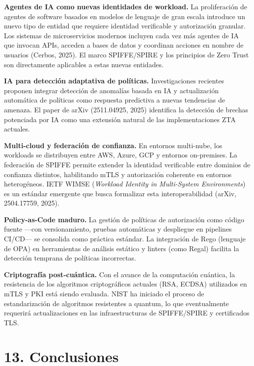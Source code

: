 \documentclass[12pt,a4paper]{article}
\begin{document}
\textbf{Agentes de IA como nuevas identidades de workload.} La proliferación de agentes de software basados en modelos de lenguaje de gran escala introduce un nuevo tipo de entidad que requiere identidad verificable y autorización granular. Los sistemas de microservicios modernos incluyen cada vez más agentes de IA que invocan APIs, acceden a bases de datos y coordinan acciones en nombre de usuarios (Cerbos, 2025). El marco SPIFFE/SPIRE y los principios de Zero Trust son directamente aplicables a estas nuevas entidades.

\textbf{IA para detección adaptativa de políticas.} Investigaciones recientes proponen integrar detección de anomalías basada en IA y actualización automática de políticas como respuesta predictiva a nuevas tendencias de amenaza. El paper de arXiv (2511.04925, 2025) identifica la detección de brechas potenciada por IA como una extensión natural de las implementaciones ZTA actuales.

\textbf{Multi-cloud y federación de confianza.} En entornos multi-nube, los workloads se distribuyen entre AWS, Azure, GCP y entornos on-premises. La federación de SPIFFE permite extender la identidad verificable entre dominios de confianza distintos, habilitando mTLS y autorización coherente en entornos heterogéneos. IETF WIMSE (\textit{Workload Identity in Multi-System Environments}) es un estándar emergente que busca formalizar esta interoperabilidad (arXiv, 2504.17759, 2025).

\textbf{Policy-as-Code maduro.} La gestión de políticas de autorización como código fuente —con versionamiento, pruebas automáticas y despliegue en pipelines CI/CD— se consolida como práctica estándar. La integración de Rego (lenguaje de OPA) en herramientas de análisis estático y linters (como Regal) facilita la detección temprana de políticas incorrectas.

\textbf{Criptografía post-cuántica.} Con el avance de la computación cuántica, la resistencia de los algoritmos criptográficos actuales (RSA, ECDSA) utilizados en mTLS y PKI está siendo evaluada. NIST ha iniciado el proceso de estandarización de algoritmos resistentes a quantum, lo que eventualmente requerirá actualizaciones en las infraestructuras de SPIFFE/SPIRE y certificados TLS.



\section{13. Conclusiones}
\end{document}
